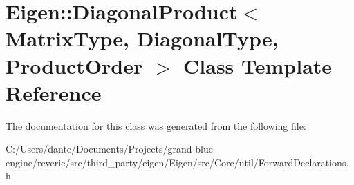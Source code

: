\hypertarget{class_eigen_1_1_diagonal_product}{}\section{Eigen\+::Diagonal\+Product$<$ Matrix\+Type, Diagonal\+Type, Product\+Order $>$ Class Template Reference}
\label{class_eigen_1_1_diagonal_product}


The documentation for this class was generated from the following file\+:\begin{DoxyCompactItemize}
\item 
C\+:/\+Users/dante/\+Documents/\+Projects/grand-\/blue-\/engine/reverie/src/third\+\_\+party/eigen/\+Eigen/src/\+Core/util/Forward\+Declarations.\+h\end{DoxyCompactItemize}
